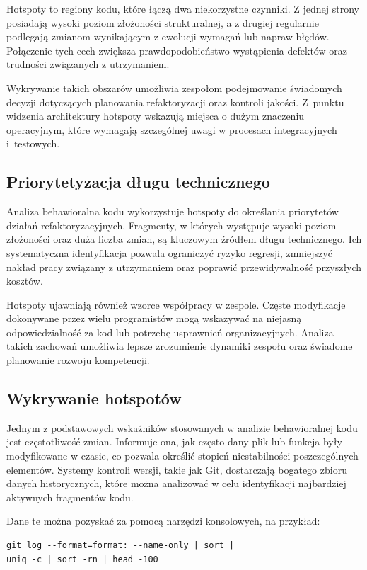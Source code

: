 Hotspoty to regiony kodu, które łączą dwa niekorzystne czynniki. Z jednej strony posiadają wysoki poziom złożoności strukturalnej, a z drugiej regularnie podlegają zmianom wynikającym z ewolucji wymagań lub napraw błędów. Połączenie tych cech zwiększa prawdopodobieństwo wystąpienia defektów oraz trudności związanych z utrzymaniem.  

Wykrywanie takich obszarów umożliwia zespołom podejmowanie świadomych decyzji dotyczących planowania refaktoryzacji oraz kontroli jakości. Z~punktu widzenia architektury hotspoty wskazują miejsca o dużym znaczeniu operacyjnym, które wymagają szczególnej uwagi w procesach integracyjnych i~testowych.

\subsection{Priorytetyzacja długu technicznego}

Analiza behawioralna kodu wykorzystuje hotspoty do określania priorytetów działań refaktoryzacyjnych. Fragmenty, w których występuje wysoki poziom złożoności oraz duża liczba zmian, są kluczowym źródłem długu technicznego. Ich systematyczna identyfikacja pozwala ograniczyć ryzyko regresji, zmniejszyć nakład pracy związany z utrzymaniem oraz poprawić przewidywalność przyszłych kosztów.

Hotspoty ujawniają również wzorce współpracy w zespole. Częste modyfikacje dokonywane przez wielu programistów mogą wskazywać na niejasną odpowiedzialność za kod lub potrzebę usprawnień organizacyjnych. Analiza takich zachowań umożliwia lepsze zrozumienie dynamiki zespołu oraz świadome planowanie rozwoju kompetencji.

\subsection{Wykrywanie hotspotów}

Jednym z podstawowych wskaźników stosowanych w analizie behawioralnej kodu jest częstotliwość zmian. Informuje ona, jak często dany plik lub funkcja były modyfikowane w czasie, co pozwala określić stopień niestabilności poszczególnych elementów. Systemy kontroli wersji, takie jak Git, dostarczają bogatego zbioru danych historycznych, które można analizować w celu identyfikacji najbardziej aktywnych fragmentów kodu.  

Dane te można pozyskać za pomocą narzędzi konsolowych, na przykład:

\begin{verbatim}
git log --format=format: --name-only | sort |
uniq -c | sort -rn | head -100
\end{verbatim}

